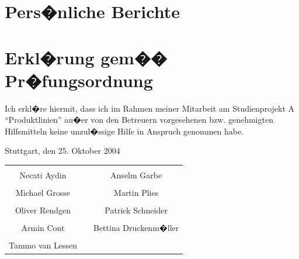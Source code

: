 \documentclass[a4paper,titlepage,12pt,ngerman]{scrbook}
\begin{document}
\chapter{Pers�nliche Berichte}











\appendix

\chapter{Erkl�rung gem�� Pr�fungsordnung}

Ich erkl�re hiermit, dass ich im Rahmen meiner Mitarbeit am
Studienprojekt A ``Produktlinien'' au�er von den
Betreuern vorgesehenen bzw. genehmigten Hilfsmitteln keine unzul�ssige
Hilfe in Anspruch genommen habe.

\vspace{2cm}
Stuttgart, den 25. Oktober 2004
\vspace{2cm}

\begin{center}
\begin{tabular}{ccc}
  \hspace{5cm} & \hspace{5cm} & \hspace{5cm} \\
  \hhline{-~-} Necati Aydin & & Anselm Garbe \\
  \vspace{1,5cm} \\
  \hhline{-~-} Michael Grosse & & Martin Plies \\
  \vspace{1,5cm} \\
  \hhline{-~-} Oliver Rendgen & & Patrick Schneider \\
    \vspace{1,5cm} \\
  \hhline{-~-} Armin Cont & & Bettina Druckenm�ller \\
  \vspace{1,5cm} \\
  \hhline{-~~} Tammo van Lessen \\
\end{tabular}
\end{center}
\end{document}
